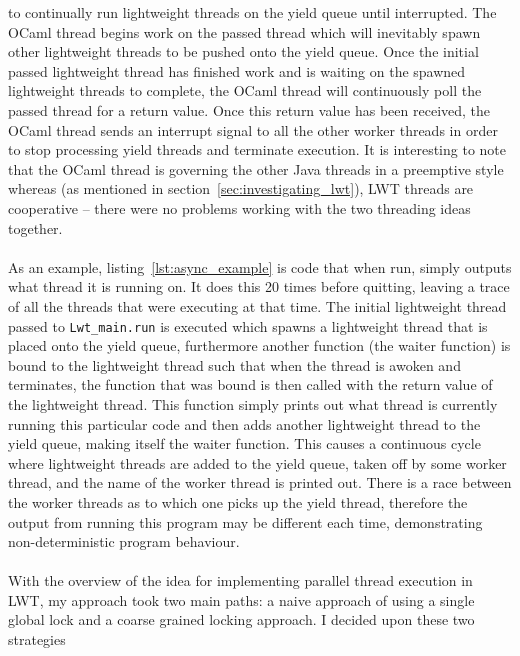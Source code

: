 \documentclass[12pt,twoside,notitlepage]{report}
\begin{document}
to continually run lightweight threads on the yield queue until interrupted. The OCaml thread begins work on the passed thread which will inevitably spawn other lightweight threads to be pushed onto the yield queue. Once the initial
passed lightweight thread has finished work and is waiting on the spawned lightweight threads to complete, the OCaml thread will continuously poll the passed thread for a return value. Once this return value has been received, the OCaml thread
sends an interrupt signal to all the other worker threads in order to stop processing yield threads and terminate execution.  It is interesting to note that the OCaml thread is governing the other Java threads in a preemptive style
whereas (as mentioned in section~\ref{sec:investigating_lwt}), LWT threads are cooperative -- there were no problems working with the two threading ideas together.
\hfill\\

\hfill\\
%
%
As an example, listing~\ref{lst:async_example} is code that when run, simply outputs what thread it is running on. It does this 20 times before quitting, leaving a trace of all the threads that
were executing at that time. The initial lightweight thread passed to {\tt Lwt\_main.run} is executed which spawns a lightweight thread that is placed onto the yield queue, furthermore another function (the waiter function) is bound
to the lightweight thread such that when the thread is awoken and terminates, the function that was bound is then called with the return value of the lightweight thread. This function simply prints out what thread is currently running this
particular code and then adds another lightweight thread to the yield queue, making itself the waiter function. This causes a continuous cycle where lightweight threads are added to the yield queue, taken off by some worker thread, and the name of the worker
thread is printed out. There is a race between the worker threads as to which one picks up the yield thread, therefore the output from running this program may be different each time, demonstrating non-deterministic program
behaviour.
\hfill\\

\hfill\\
With the overview of the idea for implementing parallel thread execution in LWT, my approach took two main paths: a naive approach of using a single global lock and a coarse grained locking approach. I decided upon these two strategies
\end{document}
